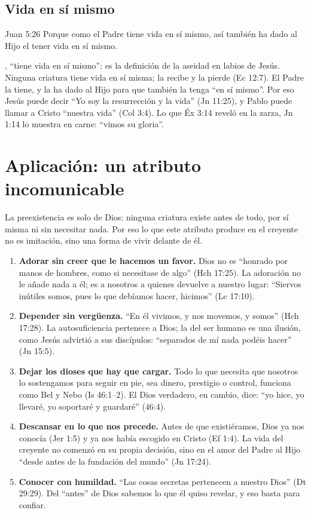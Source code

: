 \subsection{Vida en sí mismo}
\begin{verso}{Juan 5:26}
Porque como el Padre tiene vida en sí mismo, así también ha dado al Hijo el tener vida en sí mismo.
\end{verso}

, ``tiene vida en sí mismo'': es la definición de la aseidad en labios de Jesús. Ninguna criatura tiene vida en sí misma; la recibe y la pierde (Ec 12:7). El Padre la tiene, y la ha dado al Hijo para que también la tenga ``en sí mismo''. Por eso Jesús puede decir ``Yo soy la resurrección y la vida'' (Jn 11:25), y Pablo puede llamar a Cristo ``nuestra vida'' (Col 3:4). Lo que Éx 3:14 reveló en la zarza, Jn 1:14 lo muestra en carne: ``vimos su gloria''.

\section{Aplicación: un atributo incomunicable}

La preexistencia es solo de Dios: ninguna criatura existe antes de todo, por sí misma ni sin necesitar nada. Por eso lo que este atributo produce en el creyente no es imitación, sino una forma de vivir delante de él.

\begin{enumerate}
\item \textbf{Adorar sin creer que le hacemos un favor.} Dios no es ``honrado por manos de hombres, como si necesitase de algo'' (Hch 17:25). La adoración no le añade nada a él; es a nosotros a quienes devuelve a nuestro lugar: ``Siervos inútiles somos, pues lo que debíamos hacer, hicimos'' (Lc 17:10).
\item \textbf{Depender sin vergüenza.} ``En él vivimos, y nos movemos, y somos'' (Hch 17:28). La autosuficiencia pertenece a Dios; la del ser humano es una ilusión, como Jesús advirtió a sus discípulos: ``separados de mí nada podéis hacer'' (Jn 15:5).
\item \textbf{Dejar los dioses que hay que cargar.} Todo lo que necesita que nosotros lo sostengamos para seguir en pie, sea dinero, prestigio o control, funciona como Bel y Nebo (Is 46:1--2). El Dios verdadero, en cambio, dice: ``yo hice, yo llevaré, yo soportaré y guardaré'' (46:4).
\item \textbf{Descansar en lo que nos precede.} Antes de que existiéramos, Dios ya nos conocía (Jer 1:5) y ya nos había escogido en Cristo (Ef 1:4). La vida del creyente no comenzó en su propia decisión, sino en el amor del Padre al Hijo ``desde antes de la fundación del mundo'' (Jn 17:24).
\item \textbf{Conocer con humildad.} ``Las cosas secretas pertenecen a \SENOR{} nuestro Dios'' (Dt 29:29). Del ``antes'' de Dios sabemos lo que él quiso revelar, y eso basta para confiar.
\end{enumerate}

